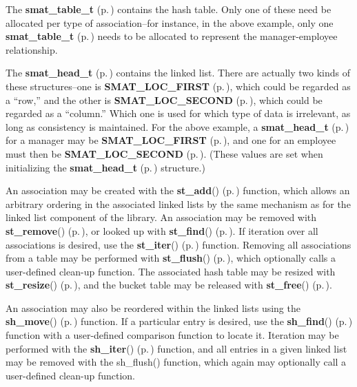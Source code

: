 The {\bf smat\_\-table\_\-t} {\rm (p.\,\pageref{group__dbprim__smat_a0})} contains the hash table. Only one of these need be allocated per type of association--for instance, in the above example, only one {\bf smat\_\-table\_\-t} {\rm (p.\,\pageref{group__dbprim__smat_a0})} needs to be allocated to represent the manager-employee relationship.

The {\bf smat\_\-head\_\-t} {\rm (p.\,\pageref{group__dbprim__smat_a1})} contains the linked list. There are actually two kinds of these structures--one is {\bf SMAT\_\-LOC\_\-FIRST} {\rm (p.\,\pageref{group__dbprim__smat_a48a102})}, which could be regarded as a ``row,'' and the other is {\bf SMAT\_\-LOC\_\-SECOND} {\rm (p.\,\pageref{group__dbprim__smat_a48a103})}, which could be regarded as a ``column.'' Which one is used for which type of data is irrelevant, as long as consistency is maintained. For the above example, a {\bf smat\_\-head\_\-t} {\rm (p.\,\pageref{group__dbprim__smat_a1})} for a manager may be {\bf SMAT\_\-LOC\_\-FIRST} {\rm (p.\,\pageref{group__dbprim__smat_a48a102})}, and one for an employee must then be {\bf SMAT\_\-LOC\_\-SECOND} {\rm (p.\,\pageref{group__dbprim__smat_a48a103})}. (These values are set when initializing the {\bf smat\_\-head\_\-t} {\rm (p.\,\pageref{group__dbprim__smat_a1})} structure.)

An association may be created with the {\bf st\_\-add}() {\rm (p.\,\pageref{group__dbprim__smat_a10})} function, which allows an arbitrary ordering in the associated linked lists by the same mechanism as for the linked list component of the library. An association may be removed with {\bf st\_\-remove}() {\rm (p.\,\pageref{group__dbprim__smat_a11})}, or looked up with {\bf st\_\-find}() {\rm (p.\,\pageref{group__dbprim__smat_a12})}. If iteration over all associations is desired, use the {\bf st\_\-iter}() {\rm (p.\,\pageref{group__dbprim__smat_a13})} function. Removing all associations from a table may be performed with {\bf st\_\-flush}() {\rm (p.\,\pageref{group__dbprim__smat_a14})}, which optionally calls a user-defined clean-up function. The associated hash table may be resized with {\bf st\_\-resize}() {\rm (p.\,\pageref{group__dbprim__smat_a15})}, and the bucket table may be released with {\bf st\_\-free}() {\rm (p.\,\pageref{group__dbprim__smat_a16})}.

An association may also be reordered within the linked lists using the {\bf sh\_\-move}() {\rm (p.\,\pageref{group__dbprim__smat_a18})} function. If a particular entry is desired, use the {\bf sh\_\-find}() {\rm (p.\,\pageref{group__dbprim__smat_a19})} function with a user-defined comparison function to locate it. Iteration may be performed with the {\bf sh\_\-iter}() {\rm (p.\,\pageref{group__dbprim__smat_a20})} function, and all entries in a given linked list may be removed with the sh\_\-flush() function, which again may optionally call a user-defined clean-up function. 

